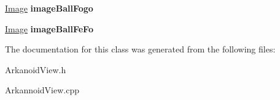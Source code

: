 \begin{DoxyCompactItemize}
\item 
\hypertarget{classArkanoidView_a60f92d77207213bb548c44fc3f1b5861}{\hyperlink{classImage}{\-Image} {\bfseries image\-Ball\-Fogo}}\label{classArkanoidView_a60f92d77207213bb548c44fc3f1b5861}

\item 
\hypertarget{classArkanoidView_af464286682b93aeefe86b344150e4e33}{\hyperlink{classImage}{\-Image} {\bfseries image\-Ball\-Fe\-Fo}}\label{classArkanoidView_af464286682b93aeefe86b344150e4e33}

\end{DoxyCompactItemize}


\-The documentation for this class was generated from the following files\-:\begin{DoxyCompactItemize}
\item 
\-Arkanoid\-View.\-h\item 
\-Arkannoid\-View.\-cpp\end{DoxyCompactItemize}

